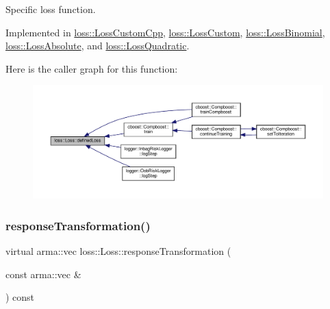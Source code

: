 Specific loss function. 



Implemented in \mbox{\hyperlink{classloss_1_1_loss_custom_cpp_abb0c51701c90ce115cd0a0440e5b28f8}{loss\+::\+Loss\+Custom\+Cpp}}, \mbox{\hyperlink{classloss_1_1_loss_custom_ad71351d35d7739651c487c2106571118}{loss\+::\+Loss\+Custom}}, \mbox{\hyperlink{classloss_1_1_loss_binomial_a396a06f762b735f83af21bdd4ba8fe9c}{loss\+::\+Loss\+Binomial}}, \mbox{\hyperlink{classloss_1_1_loss_absolute_af10b320d7253ef4f566530717441059e}{loss\+::\+Loss\+Absolute}}, and \mbox{\hyperlink{classloss_1_1_loss_quadratic_a7495a0d225ae5470840e8f377419d7cf}{loss\+::\+Loss\+Quadratic}}.

Here is the caller graph for this function\+:\nopagebreak
\begin{figure}[H]
\begin{center}
\leavevmode
\includegraphics[width=350pt]{classloss_1_1_loss_ae9f94dd9b8311397583ba3a9cb485e94_icgraph}
\end{center}
\end{figure}
\mbox{\label{classloss_1_1_loss_a0a84b7df79b08e40b538aaa7e6ee75c4}} 
\subsubsection{\texorpdfstring{response\+Transformation()}{responseTransformation()}}
{\footnotesize\ttfamily virtual arma\+::vec loss\+::\+Loss\+::response\+Transformation (\begin{DoxyParamCaption}\item[{const arma\+::vec \&}]{ }\end{DoxyParamCaption}) const\hspace{0.3cm}{\ttfamily [pure virtual]}}



